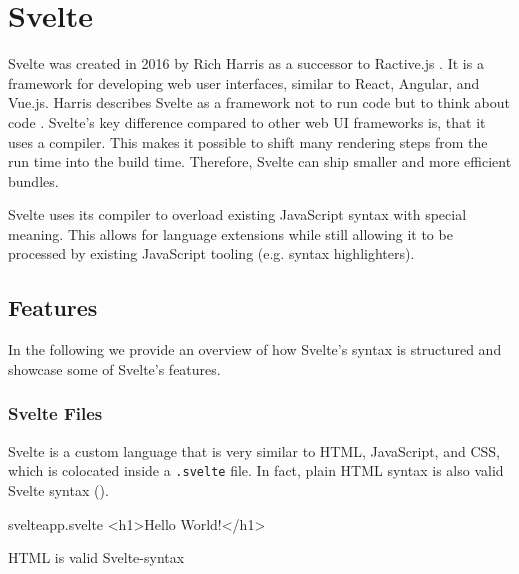 \section{Svelte}
\label{sec:svelte}

Svelte was created in 2016 by Rich Harris as a successor to Ractive.js \cite{offerzen_origins_svelte_2022}. It is a framework for developing web user interfaces, similar to React, Angular, and Vue.js. Harris describes Svelte as a framework not to run code but to think about code \cite{offerzen_origins_svelte_2022}. Svelte's key difference compared to other web UI frameworks is, that it uses a compiler. This makes it possible to shift many rendering steps from the run time into the build time. Therefore, Svelte can ship smaller and more efficient bundles. 

Svelte uses its compiler to overload existing JavaScript syntax with special meaning. This allows for language extensions while still allowing it to be processed by existing JavaScript tooling (e.g. syntax highlighters).

\subsection{Features}

In the following we provide an overview of how Svelte's syntax is structured and showcase some of Svelte's features.

\subsubsection{Svelte Files}

Svelte is a custom language that is very similar to HTML, JavaScript, and CSS, which is colocated inside a \texttt{.svelte} file. In fact, plain HTML syntax is also valid Svelte syntax ().

\begin{listing}[h!]
\begin{myminted}{svelte}{app.svelte}
<h1>Hello World!</h1>
\end{myminted}
\caption{HTML is valid Svelte-syntax}
\label{fig:svelte-basic-html}
\end{listing}

